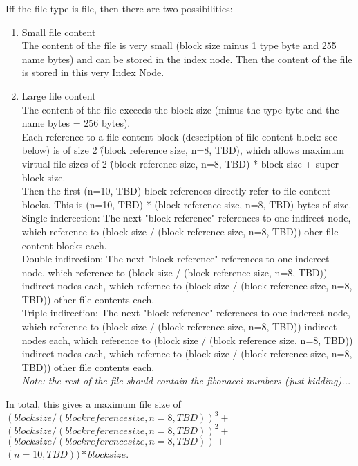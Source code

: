 \documentclass[a4paper,12pt]{article}
\begin{document}
Iff the file type is file, then there are two possibilities:

\begin{enumerate}
  \item Small file content\\
  The content of the file is very small (block size minus 1 type byte and 255 name bytes) and can be stored in the index node. Then the content of the file is stored in this very Index Node.
  \item Large file content\\
The content of the file exceeds the block size (minus the type byte and the name bytes = 256 bytes).\\
Each reference to a file content block (description of file content block: see below) is of size 2 \^ (block reference size, n=8, TBD), which allows maximum virtual file sizes of 2 \^ (block reference size, n=8, TBD) * block size + super block size.\\
Then the first (n=10, TBD) block references directly refer to file content blocks. This is (n=10, TBD) * (block reference size, n=8, TBD) bytes of size.\\
Single inderection: The next "block reference" references to one indirect node, which reference to (block size / (block reference size, n=8, TBD)) oher file content blocks each.\\
Double indirection: The next "block reference" references to one inderect node, which reference to (block size / (block reference size, n=8, TBD)) indirect nodes each, which refernce to (block size / (block reference size, n=8, TBD)) other file contents each.\\
Triple indirection: The next "block reference" references to one inderect node, which reference to (block size / (block reference size, n=8, TBD)) indirect nodes each, which reference to (block size / (block reference size, n=8, TBD)) indirect nodes each, which refernce to (block size / (block reference size, n=8, TBD)) other file contents each.\\
\emph{Note: the rest of the file should contain the fibonacci numbers (just kidding)...}\\
\end{enumerate}

In total, this gives a maximum file size of\\
$(block size / (block reference size, n=8, TBD))^{3} +$\\
$(block size / (block reference size, n=8, TBD))^{2} +$\\
$(block size / (block reference size, n=8, TBD)) + $\\
$(n=10, TBD)) * block size$.
\end{document}
